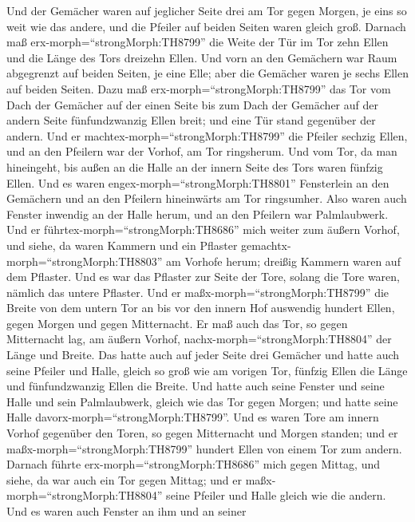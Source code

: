  Und der Gemächer waren auf jeglicher Seite drei am Tor
gegen Morgen, je eins so weit wie das andere, und die Pfeiler auf beiden
Seiten waren gleich groß.  Darnach maß
erx-morph=``strongMorph:TH8799'' die Weite der Tür im Tor zehn Ellen und
die Länge des Tors dreizehn Ellen.  Und vorn an den
Gemächern war Raum abgegrenzt auf beiden Seiten, je eine Elle; aber die
Gemächer waren je sechs Ellen auf beiden Seiten.  Dazu maß
erx-morph=``strongMorph:TH8799'' das Tor vom Dach der Gemächer auf der
einen Seite bis zum Dach der Gemächer auf der andern Seite
fünfundzwanzig Ellen breit; und eine Tür stand gegenüber der andern.
 Und er machtex-morph=``strongMorph:TH8799'' die Pfeiler
sechzig Ellen, und an den Pfeilern war der Vorhof, am Tor ringsherum.
 Und vom Tor, da man hineingeht, bis außen an die Halle an
der innern Seite des Tors waren fünfzig Ellen.  Und es
waren engex-morph=``strongMorph:TH8801'' Fensterlein an den Gemächern
und an den Pfeilern hineinwärts am Tor ringsumher. Also waren auch
Fenster inwendig an der Halle herum, und an den Pfeilern war
Palmlaubwerk.  Und er führtex-morph=``strongMorph:TH8686''
mich weiter zum äußern Vorhof, und siehe, da waren Kammern und ein
Pflaster gemachtx-morph=``strongMorph:TH8803'' am Vorhofe herum; dreißig
Kammern waren auf dem Pflaster.  Und es war das Pflaster
zur Seite der Tore, solang die Tore waren, nämlich das untere Pflaster.
 Und er maßx-morph=``strongMorph:TH8799'' die Breite von
dem untern Tor an bis vor den innern Hof auswendig hundert Ellen, gegen
Morgen und gegen Mitternacht.  Er maß auch das Tor, so
gegen Mitternacht lag, am äußern Vorhof,
nachx-morph=``strongMorph:TH8804'' der Länge und Breite. 
Das hatte auch auf jeder Seite drei Gemächer und hatte auch seine
Pfeiler und Halle, gleich so groß wie am vorigen Tor, fünfzig Ellen die
Länge und fünfundzwanzig Ellen die Breite.  Und hatte auch
seine Fenster und seine Halle und sein Palmlaubwerk, gleich wie das Tor
gegen Morgen; und hatte seine Halle davorx-morph=``strongMorph:TH8799''.
 Und es waren Tore am innern Vorhof gegenüber den Toren, so
gegen Mitternacht und Morgen standen; und er
maßx-morph=``strongMorph:TH8799'' hundert Ellen von einem Tor zum
andern.  Darnach führte erx-morph=``strongMorph:TH8686''
mich gegen Mittag, und siehe, da war auch ein Tor gegen Mittag; und er
maßx-morph=``strongMorph:TH8804'' seine Pfeiler und Halle gleich wie die
andern.  Und es waren auch Fenster an ihm und an seiner
